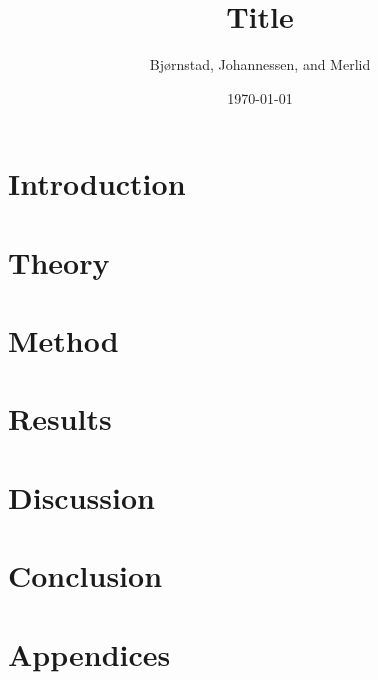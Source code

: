 \documentclass[aps,rmp,reprint,amsmath,amssymb,twocolumn,floatfix]{revtex4-1}
\begin{document}
\title{Title}

\author{Bjørnstad, Johannessen, and Merlid}
\date{\today}


\begin{abstract}

\end{abstract}
\maketitle

\tableofcontents

\section{Introduction}
\label{sec:introduction}

\section{Theory}


\section{Method}


\section{Results}


\section{Discussion}


\section{Conclusion}


\newpage
{} %

\clearpage
\appendix
\section{Appendices}
\label{appendix}

\end{document}
